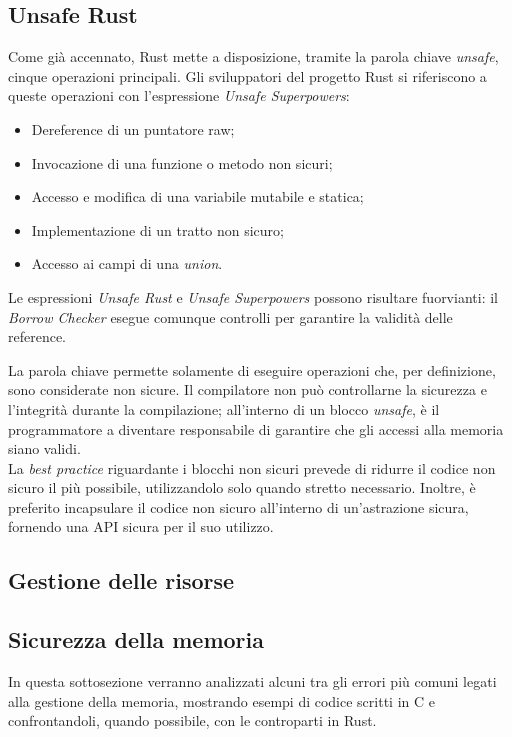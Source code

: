\subsection*{Unsafe Rust}
Come già accennato, Rust mette a disposizione, tramite la parola chiave \textit{unsafe}, cinque operazioni principali. Gli sviluppatori
del progetto Rust si riferiscono a queste operazioni con l'espressione \textit{Unsafe Superpowers}:
\begin{itemize}
    \item Dereference di un puntatore raw;
    \item Invocazione di una funzione o metodo non sicuri;
    \item Accesso e modifica di una variabile mutabile e statica;
    \item Implementazione di un tratto non sicuro;
    \item Accesso ai campi di una \textit{union}.
\end{itemize}
Le espressioni \textit{Unsafe Rust} e \textit{Unsafe Superpowers} possono risultare fuorvianti: il \textit{Borrow Checker} esegue 
comunque controlli per garantire la validità delle reference. 

La parola chiave permette solamente di eseguire operazioni che, per definizione, sono considerate non sicure. 
Il compilatore non può controllarne la sicurezza e l'integrità durante la compilazione; all'interno di un blocco
 \textit{unsafe}, è il programmatore a diventare responsabile di garantire che gli accessi alla memoria
siano validi. \hfill
\vspace{12pt}\\
\noindent La \textit{best practice} riguardante i blocchi non sicuri prevede di ridurre il codice non sicuro il più possibile, utilizzandolo solo quando stretto necessario.
Inoltre, è preferito incapsulare il codice non sicuro all'interno di un'astrazione sicura, fornendo una API sicura per il suo utilizzo. \hfill

\subsection{Gestione delle risorse}

\subsection{Sicurezza della memoria}
In questa sottosezione verranno analizzati alcuni tra gli errori più comuni legati alla gestione della memoria,
mostrando esempi di codice scritti in C e confrontandoli, quando possibile, con le controparti in Rust.

